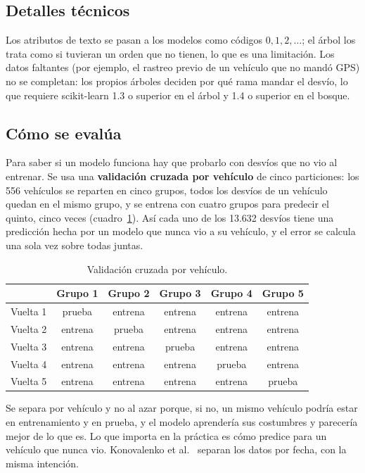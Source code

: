 \documentclass[11pt,a4paper]{article}
\begin{document}
\subsection{Detalles técnicos}

Los atributos de texto se pasan a los modelos como códigos $0,1,2,\dots$; el árbol los trata como si
tuvieran un orden que no tienen, lo que es una limitación. Los datos faltantes (por ejemplo, el rastreo
previo de un vehículo que no mandó GPS) no se completan: los propios árboles deciden por qué rama mandar el
desvío, lo que requiere scikit-learn 1.3 o superior en el árbol y 1.4 o superior en el bosque.

\subsection{Cómo se evalúa}

Para saber si un modelo funciona hay que probarlo con desvíos que no vio al entrenar. Se usa una
\textbf{validación cruzada por vehículo} de cinco particiones: los 556 vehículos se reparten en cinco grupos,
todos los desvíos de un vehículo quedan en el mismo grupo, y se entrena con cuatro grupos para predecir el
quinto, cinco veces (cuadro~\ref{tab:cv}). Así cada uno de los 13.632 desvíos tiene una predicción hecha por
un modelo que nunca vio a su vehículo, y el error se calcula una sola vez sobre todas juntas.

\begin{table}[H]
  \centering
  \begin{tabular}{@{}lccccc@{}}
    \toprule
    & \textbf{Grupo 1} & \textbf{Grupo 2} & \textbf{Grupo 3} & \textbf{Grupo 4} & \textbf{Grupo 5} \\
    \midrule
    Vuelta 1 & prueba  & entrena & entrena & entrena & entrena \\
    Vuelta 2 & entrena & prueba  & entrena & entrena & entrena \\
    Vuelta 3 & entrena & entrena & prueba  & entrena & entrena \\
    Vuelta 4 & entrena & entrena & entrena & prueba  & entrena \\
    Vuelta 5 & entrena & entrena & entrena & entrena & prueba  \\
    \bottomrule
  \end{tabular}
  \caption{Validación cruzada por vehículo.}
  \label{tab:cv}
\end{table}

Se separa por vehículo y no al azar porque, si no, un mismo vehículo podría estar en entrenamiento y en
prueba, y el modelo aprendería sus costumbres y parecería mejor de lo que es. Lo que importa en la práctica
es cómo predice para un vehículo que nunca vio. Konovalenko et al.~\cite{konovalenko} separan los datos por
fecha, con la misma intención.
\end{document}
